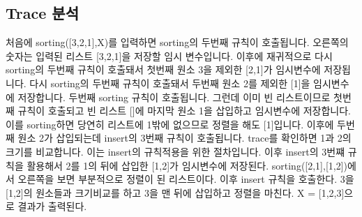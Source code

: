 \documentclass{article}
\begin{document}
\subsection{Trace 분석}
처음에 sorting([3,2,1],X)를 입력하면 sorting의 두번째 규칙이 호출됩니다. 오른쪽의 숫자는 입력된 리스트 [3,2,1]을 저장할 임시 변수입니다. 이후에 재귀적으로 다시 sorting의 두번째 규칙이 호출돼서 첫번째 원소 3을 제외한 [2,1]가 임시변수에 저장됩니다. 다시 sorting의 두번째 규칙이 호출돼서 두번째 원소 2를 제외한 [1]을 임시변수에 저장합니다. 두번째 sorting 규칙이 호출됩니다. 그런데 이미 빈 리스트이므로 첫번째 규칙이 호출되고 빈 리스트 []에 마지막 원소 1을 삽입하고 임시변수에 저장합니다. 이를 sorting하면 당연히 리스트에 1밖에 없으므로 정렬을 해도 [1]입니다. 이후에 두번째 원소 2가 삽입되는데 insert의 3번째 규칙이 호출됩니다. trace를 확인하면 1과 2의 크기를 비교합니다. 이는 insert의 규칙적용을 위한 절차입니다. 이후 insert의 3번쨰 규칙을 활용해서 2를 1의 뒤에 삽입한 [1,2]가 임시변수에 저장된다. sorting([2,1],[1,2])에서 오른쪽을 보면 부분적으로 정렬이 된 리스트이다. 이후 insert 규칙을 호출한다. 3을 [1,2]의 원소들과 크기비교를 하고 3을 맨 뒤에 삽입하고 정렬을 마친다. X = [1,2,3]으로 결과가 출력된다.
\end{document}

